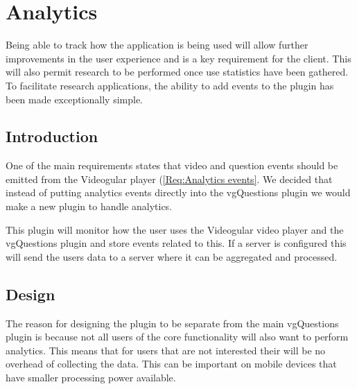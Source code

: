 
\chapter{Analytics} \label{Chapter: Analytics}

\begin{preamble}
	Being able to track how the application is being used will allow further improvements in the user experience and is a key requirement for the client. This will also permit research to be performed once use statistics have been gathered. To facilitate research applications, the ability to add events to the plugin has been made exceptionally simple.
\end{preamble}

\section{Introduction}

One of the main requirements states  that video and question events should be emitted from the Videogular player (\cref{Req:Analytics events}. We decided that instead of putting analytics events directly into the \gls{vgQuestions} plugin we would make a new plugin to handle analytics.

This plugin will monitor how the user uses the \gls{Videogular} video player and the \gls{vgQuestions} plugin and store events related to this. If a server is configured this will send the users data to a server where it can be aggregated and processed.

\section{Design}

The reason for designing the plugin to be separate from the main vgQuestions plugin is because not all users of the core functionality will also want to perform analytics. This means that for users that are not interested their will be no overhead of collecting the data. This can be important on mobile devices that have smaller processing power available.


